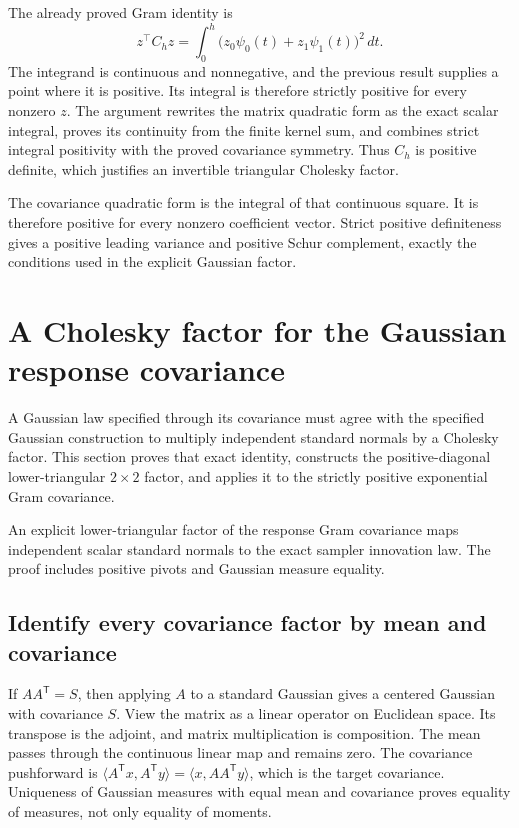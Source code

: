 \documentclass[11pt,a4paper]{report}
\begin{document}
The already proved Gram identity is \[z^\top C_hz=\int_0^h\bigl(z_0\psi_0(t)+z_1\psi_1(t)\bigr)^2\,dt.\] The integrand is continuous and nonnegative, and the previous result supplies a point where it is positive. Its integral is therefore strictly positive for every nonzero \(z\). The argument rewrites the matrix quadratic form as the exact scalar integral, proves its continuity from the finite kernel sum, and combines strict integral positivity with the proved covariance symmetry. Thus \(C_h\) is positive definite, which justifies an invertible triangular Cholesky factor.



The covariance quadratic form is the integral of that continuous square. It is therefore positive for every nonzero coefficient vector. Strict positive definiteness gives a positive leading variance and positive Schur complement, exactly the conditions used in the explicit Gaussian factor.

\section{\texorpdfstring{A Cholesky factor for the Gaussian response covariance}{A Cholesky factor for the Gaussian response covariance}}
\label{proof-module-KineticLangevin-GaussianFactor-lean}


A Gaussian law specified through its covariance must agree with the specified Gaussian construction to multiply independent standard normals by a Cholesky factor. This section proves that exact identity, constructs the positive-diagonal lower-triangular \(2\times2\) factor, and applies it to the strictly positive exponential Gram covariance.



An explicit lower-triangular factor of the response Gram covariance maps independent scalar standard normals to the exact sampler innovation law. The proof includes positive pivots and Gaussian measure equality.

\subsection{\texorpdfstring{Identify every covariance factor by mean and covariance}{Identify every covariance factor by mean and covariance}}
\label{report-step-KineticLangevin-GaussianFactor-lean-1}


If \(AA^\mathsf T=S\), then applying \(A\) to a standard Gaussian gives a centered Gaussian with covariance \(S\). View the matrix as a linear operator on Euclidean space. Its transpose is the adjoint, and matrix multiplication is composition. The mean passes through the continuous linear map and remains zero. The covariance pushforward is \(\langle A^\mathsf Tx,A^\mathsf Ty\rangle=\langle x,AA^\mathsf Ty\rangle\), which is the target covariance. Uniqueness of Gaussian measures with equal mean and covariance proves equality of measures, not only equality of moments.
\end{document}

